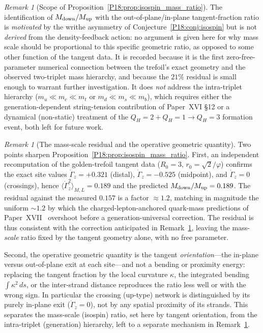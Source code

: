 \documentclass[11pt,a4paper]{article}
\theoremstyle{definition}\newtheorem{definition}[theorem]{Definition}
\theoremstyle{remark}
\newtheorem{remark}[theorem]{Remark}
\newcommand{\vp}{\varphi}
\newcommand{\QH}{Q_H}
\begin{document}
\begin{remark}[Scope of Proposition~\ref{P18:prop:isospin_mass_ratio}]
\label{P18:rem:isospin_mass_ratio_scope}
The identification of $M_{\rm down}/M_{\rm up}$ with the
out-of-plane/in-plane tangent-fraction ratio is \emph{motivated} by
the writhe asymmetry of Conjecture~\ref{P18:conj:isospin} but is not
\emph{derived} from the density-feedback action: no argument is
given here for why mass scale should be proportional to this
specific geometric ratio, as opposed to some other function of the
tangent data.  It is recorded because it is the first
zero-free-parameter numerical connection between the trefoil's
exact geometry and the observed two-triplet mass hierarchy, and
because the $21\%$ residual is small enough to warrant further
investigation.  It does \emph{not} address the intra-triplet
hierarchy ($m_u\ll m_c\ll m_t$ or $m_d\ll m_s\ll m_b$), which
requires either the generation-dependent string-tension
contribution of Paper~XVI \S12 or a dynamical (non-static)
treatment of the $\QH=2+\QH=1\to\QH=3$ formation event, both left
for future work.
\end{remark}

\begin{remark}[The mass-scale residual and the operative geometric quantity]
\label{P18:rem:isospin_scale_residual}
Two points sharpen Proposition~\ref{P18:prop:isospin_mass_ratio}.
First, an independent recomputation of the golden-trefoil tangent data
($R_0=3$, $r_0=\sqrt{2}/\vp$) confirms the exact site values
$\dot\Gamma_z=+0.321$ (distal), $\dot\Gamma_z=-0.525$ (midpoint), and
$\dot\Gamma_z=0$ (crossings), hence
$\langle\dot\Gamma_z^2\rangle_{M,L}=0.189$ and the predicted
$M_{\rm down}/M_{\rm up}=0.189$. The residual against the measured
$0.157$ is a factor $\approx1.2$, matching in magnitude the uniform
$\sim\!1.2$ by which the charged-lepton-anchored quark-mass
predictions of Paper~XVII~\cite{Paper17} overshoot before a
generation-universal correction. The residual is thus consistent with
the correction anticipated in
Remark~\ref{P18:rem:isospin_mass_ratio_scope}, leaving the
mass-\emph{scale} ratio fixed by the tangent geometry alone, with no
free parameter.

Second, the operative geometric quantity is the tangent
\emph{orientation}---the in-plane versus out-of-plane exit at each
site---and not a bending or proximity energy: replacing the tangent
fraction by the local curvature $\kappa$, the integrated bending
$\int\kappa^2\,ds$, or the inter-strand distance reproduces the ratio
less well or with the wrong sign. In particular the crossing
(up-type) network is distinguished by its purely in-plane exit
($\dot\Gamma_z=0$), not by any spatial proximity of its strands. This
separates the mass-scale (isospin) ratio, set here by tangent
orientation, from the intra-triplet (generation) hierarchy, left to a
separate mechanism in
Remark~\ref{P18:rem:isospin_mass_ratio_scope}.
\end{remark}
\end{document}
